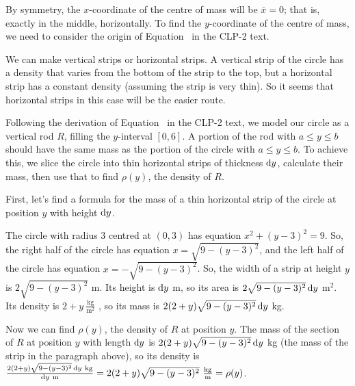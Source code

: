 \begin{solution}
By symmetry, the $x$-coordinate of the centre of mass will be $\bar x =0$; that is, exactly in the middle, horizontally. To find the $y$-coordinate of the centre of mass, we need to consider the origin of Equation~ in the CLP-2 text.

We can make vertical strips or horizontal strips. A vertical strip of the circle has a density that varies from the bottom of the strip to the top, but a horizontal strip has a constant density (assuming the strip is very thin). So it seems that horizontal strips in this case will be the easier route.

Following the derivation of Equation~ in the CLP-2 text, we model our circle as a vertical rod $R$, filling the $y$-interval $[0, 6]$. A portion of the rod with $a \le y \le b$ should have the same mass as the portion of the circle with $a \le y \le b$. To achieve this, we slice the circle into thin horizontal strips of thickness $\mathrm{d}y$, calculate their mass, then use that to find $\rho(y)$, the density of $R$.

{First, let's find a formula for the mass of a thin horizontal strip of the circle at position $y$ with height $\mathrm{d}y$.}

\begin{center}
\end{center}

The circle with radius 3 centred at $(0,3)$ has equation $x^2+(y-3)^2=9$. So, the right half of the circle has equation $x=\sqrt{9-(y-3)^2}$, and the left half of the circle has equation $x=-\sqrt{9-(y-3)^2}$. So, the width of a strip at height $y$ is $2\sqrt{9-(y-3)^2}$ m. Its height is $\mathrm{d}y$ m, so its area is $2\sqrt{9-(y-3)^2}\,\mathrm{d}y$ m$^2$. Its density is $2+y~\frac{\text{kg}}{\text{m}^2}$ , so its mass is $2(2+y)\sqrt{9-(y-3)^2}\,\mathrm{d}y$ kg.

Now we can find $\rho(y)$, the density of $R$ at position $y$. The mass of the section of $R$ at position $y$ with length $\mathrm{d}y$ is $2(2+y)\sqrt{9-(y-3)^2}\,\mathrm{d}y$ kg (the mass of the strip in the paragraph above), so its density is $\frac{2(2+y)\sqrt{9-(y-3)^2}\,\mathrm{d}y~\text{kg}}{\mathrm{d}y~\text{m}} = 2(2+y)\sqrt{9-(y-3)^2}~\frac{\text{kg}}{\text{m}} = \rho(y)$.


\end{solution}
